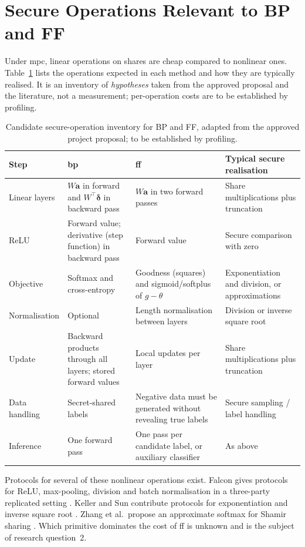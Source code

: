\section{Secure Operations Relevant to BP and FF}\label{sec:bg-ops}
Under \ac{mpc}, linear operations on shares are cheap compared to nonlinear ones. Table~\ref{tab:bg-ops} lists the operations expected in each method and how they are typically realised. It is an inventory of \emph{hypotheses} taken from the approved proposal and the literature, not a measurement; per-operation costs are to be established by profiling.

\begin{table}[ht]
\centering
\small
\begin{tabular}{@{}>{\raggedright\arraybackslash}p{2.4cm}>{\raggedright\arraybackslash}p{3.6cm}>{\raggedright\arraybackslash}p{3.6cm}>{\raggedright\arraybackslash}p{3.5cm}@{}}
\toprule
Step & \ac{bp} & \ac{ff} & Typical secure realisation \\
\midrule
Linear layers & $W\mathbf{a}$ in forward and $W^\top\boldsymbol\delta$ in backward pass & $W\mathbf{a}$ in two forward passes & Share multiplications plus truncation \\
ReLU & Forward value; derivative (step function) in backward pass & Forward value & Secure comparison with zero \\
Objective & Softmax and cross-entropy & Goodness (squares) and sigmoid/softplus of $g-\theta$ & Exponentiation and division, or approximations \cite{keller2022sqt,zhang2025efficient} \\
Normalisation & Optional & Length normalisation between layers & Division or inverse square root \cite{keller2022sqt} \\
Update & Backward products through all layers; stored forward values & Local updates per layer & Share multiplications plus truncation \\
Data handling & Secret-shared labels & Negative data must be generated without revealing true labels & Secure sampling / label handling \\
Inference & One forward pass & One pass per candidate label, or auxiliary classifier & As above \\
\bottomrule
\end{tabular}
\caption{Candidate secure-operation inventory for BP and FF, adapted from the approved project proposal; to be established by profiling.}
\label{tab:bg-ops}
\end{table}

Protocols for several of these nonlinear operations exist. Falcon gives protocols for ReLU, max-pooling, division and batch normalisation in a three-party replicated setting \cite{wagh2021falcon}. Keller and Sun contribute protocols for exponentiation and inverse square root \cite{keller2022sqt}. Zhang et al.\ propose an approximate softmax for Shamir sharing \cite{zhang2025efficient}. Which primitive dominates the cost of \ac{ff} is unknown and is the subject of research question~2.


